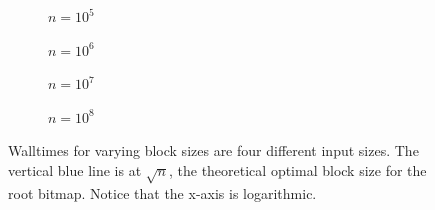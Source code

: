 
\begin{figure}\tiny

\begin{subfigure}{0.48\textwidth}
	
	\caption{$n = 10^5$}
	\label{fig:PrecomputedRankBlockSizeVaryN_5_Rank_WallTime}
\end{subfigure}
\hfill
\begin{subfigure}{0.48\textwidth}
	
	\caption{$n = 10^6$}
	\label{fig:PrecomputedRankBlockSizeVaryN_6_Rank_WallTime}
\end{subfigure}

\begin{subfigure}{0.48\textwidth}
	
	\caption{$n = 10^7$}
	\label{fig:PrecomputedRankBlockSizeVaryN_7_Rank_WallTime}
\end{subfigure}
\hfill	
\begin{subfigure}{0.48\textwidth}
	
	\caption{$n = 10^8$}
	\label{fig:PrecomputedRankBlockSizeVaryN_8_Rank_WallTime}
\end{subfigure}
\caption{Walltimes for varying block sizes are four different input sizes. The vertical blue line is at $\sqrt{n}$, the theoretical optimal block size for the root bitmap. Notice that the x-axis is logarithmic.}
\label{fig:PrecomputedRankBlockSizeVaryN_Rank_WallTime}
\end{figure}

\restoregeometry